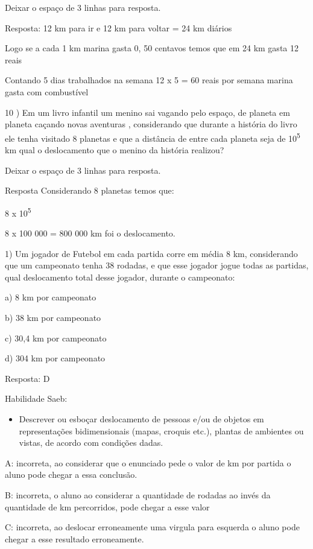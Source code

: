 Deixar o espaço de 3 linhas para resposta.

Resposta: 12 km para ir e 12 km para voltar = 24 km diários

Logo se a cada 1 km marina gasta 0, 50 centavos temos que em 24 km gasta
12 reais

Contando 5 dias trabalhados na semana 12 x 5 = 60 reais por semana
marina gasta com combustível

10 ) Em um livro infantil um menino sai vagando pelo espaço, de planeta
em planeta caçando novas aventuras , considerando que durante a história
do livro ele tenha visitado 8 planetas e que a distância de entre cada
planeta seja de 10\textsuperscript{5} km qual o deslocamento que o
menino da história realizou?

Deixar o espaço de 3 linhas para resposta.

Resposta Considerando 8 planetas temos que:

8 x 10\textsuperscript{5}

8 x 100 000 = 800 000 km foi o deslocamento.


1) Um jogador de Futebol em cada partida corre em média 8 km,
considerando que um campeonato tenha 38 rodadas, e que esse jogador
jogue todas as partidas, qual deslocamento total desse jogador, durante
o campeonato:

a) 8 km por campeonato

b) 38 km por campeonato

c) 30,4 km por campeonato

d) 304 km por campeonato

Resposta: D

Habilidade Saeb:

\begin{itemize}
\tightlist
\item
  Descrever ou esboçar deslocamento de pessoas e/ou de objetos em
  representações bidimensionais (mapas, croquis etc.), plantas de
  ambientes ou vistas, de acordo com condições dadas.
\end{itemize}

A: incorreta, ao considerar que o enunciado pede o valor de km por
partida o aluno pode chegar a essa conclusão.

B: incorreta, o aluno ao considerar a quantidade de rodadas ao invés da
quantidade de km percorridos, pode chegar a esse valor

C: incorreta, ao deslocar erroneamente uma virgula para esquerda o aluno
pode chegar a esse resultado erroneamente.

